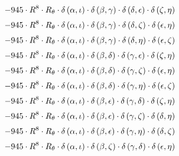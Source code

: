 \begin{subequations}
\begin{gather}
 \\[0.2em] \notag 		 - 945 \cdot R^{8} \cdot R_{\theta{}} \cdot \delta{}\left(\alpha{}, \iota{}\right) \cdot \delta{}\left(\beta{}, \gamma{}\right) \cdot \delta{}\left(\delta{}, \epsilon{}\right) \cdot \delta{}\left(\zeta{}, \eta{}\right) 
 \\[0.2em] \notag 		 - 945 \cdot R^{8} \cdot R_{\theta{}} \cdot \delta{}\left(\alpha{}, \iota{}\right) \cdot \delta{}\left(\beta{}, \gamma{}\right) \cdot \delta{}\left(\delta{}, \zeta{}\right) \cdot \delta{}\left(\epsilon{}, \eta{}\right) 
 \\[0.2em] \notag 		 - 945 \cdot R^{8} \cdot R_{\theta{}} \cdot \delta{}\left(\alpha{}, \iota{}\right) \cdot \delta{}\left(\beta{}, \gamma{}\right) \cdot \delta{}\left(\delta{}, \eta{}\right) \cdot \delta{}\left(\epsilon{}, \zeta{}\right) 
 \\[0.2em] \notag 		 - 945 \cdot R^{8} \cdot R_{\theta{}} \cdot \delta{}\left(\alpha{}, \iota{}\right) \cdot \delta{}\left(\beta{}, \delta{}\right) \cdot \delta{}\left(\gamma{}, \epsilon{}\right) \cdot \delta{}\left(\zeta{}, \eta{}\right) 
 \\[0.2em] \notag 		 - 945 \cdot R^{8} \cdot R_{\theta{}} \cdot \delta{}\left(\alpha{}, \iota{}\right) \cdot \delta{}\left(\beta{}, \delta{}\right) \cdot \delta{}\left(\gamma{}, \zeta{}\right) \cdot \delta{}\left(\epsilon{}, \eta{}\right) 
 \\[0.2em] \notag 		 - 945 \cdot R^{8} \cdot R_{\theta{}} \cdot \delta{}\left(\alpha{}, \iota{}\right) \cdot \delta{}\left(\beta{}, \delta{}\right) \cdot \delta{}\left(\gamma{}, \eta{}\right) \cdot \delta{}\left(\epsilon{}, \zeta{}\right) 
 \\[0.2em] \notag 		 - 945 \cdot R^{8} \cdot R_{\theta{}} \cdot \delta{}\left(\alpha{}, \iota{}\right) \cdot \delta{}\left(\beta{}, \epsilon{}\right) \cdot \delta{}\left(\gamma{}, \delta{}\right) \cdot \delta{}\left(\zeta{}, \eta{}\right) 
 \\[0.2em] \notag 		 - 945 \cdot R^{8} \cdot R_{\theta{}} \cdot \delta{}\left(\alpha{}, \iota{}\right) \cdot \delta{}\left(\beta{}, \epsilon{}\right) \cdot \delta{}\left(\gamma{}, \zeta{}\right) \cdot \delta{}\left(\delta{}, \eta{}\right) 
 \\[0.2em] \notag 		 - 945 \cdot R^{8} \cdot R_{\theta{}} \cdot \delta{}\left(\alpha{}, \iota{}\right) \cdot \delta{}\left(\beta{}, \epsilon{}\right) \cdot \delta{}\left(\gamma{}, \eta{}\right) \cdot \delta{}\left(\delta{}, \zeta{}\right) 
 \\[0.2em] \notag 		 - 945 \cdot R^{8} \cdot R_{\theta{}} \cdot \delta{}\left(\alpha{}, \iota{}\right) \cdot \delta{}\left(\beta{}, \zeta{}\right) \cdot \delta{}\left(\gamma{}, \delta{}\right) \cdot \delta{}\left(\epsilon{}, \eta{}\right) 

\end{gather}
\end{subequations}

